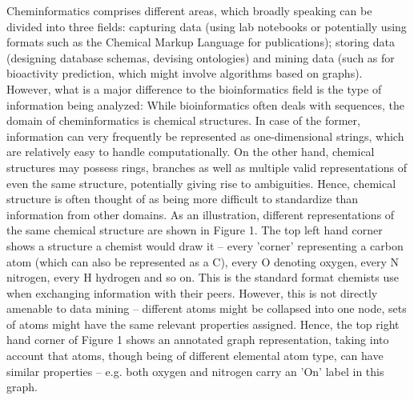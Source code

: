 \documentclass{sig-alternate}
\begin{document}
Cheminformatics comprises different areas, which broadly speaking can be divided
into three fields: capturing data (using lab notebooks or potentially using
formats such as the Chemical Markup Language for publications); storing data
(designing database schemas, devising ontologies) and mining data (such as for
bioactivity prediction, which might involve algorithms based on graphs).
However, what is a major difference to the bioinformatics field is the type of
information being analyzed: While bioinformatics often deals with sequences, the
domain of cheminformatics is chemical structures. In case of the former,
information can very frequently be represented as one-dimensional strings, which
are relatively easy to handle computationally. On the other hand, chemical
structures may possess rings, branches as well as multiple valid representations
of even the same structure, potentially giving rise to ambiguities. Hence,
chemical structure is often thought of as being more difficult to standardize
than information from other domains. As an illustration, different
representations of the same chemical structure are shown in Figure 1. The top
left hand corner shows a structure a chemist would draw it -- every 'corner'
representing a carbon atom (which can also be represented as a C), every O
denoting oxygen, every N nitrogen, every H hydrogen and so on. This is the
standard format chemists use when exchanging information with their peers.
However, this is not directly amenable to data mining -- different atoms might
be collapsed into one node, sets of atoms might have the same relevant
properties assigned. Hence, the top right hand corner of Figure 1 shows an
annotated graph representation, taking into account that atoms, though being of
different elemental atom type, can have similar properties -- e.g. both oxygen
and nitrogen carry an 'On' label in this graph.

\end{document}
